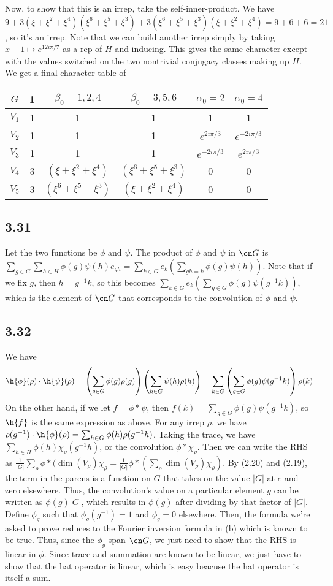 \documentclass{article}
\begin{document}
Now, to show that this is an irrep, take the self-inner-product. We have $9+3(\xi+\xi^2+\xi^4)(\xi^6+\xi^5+\xi^3)+3(\xi^6+\xi^5+\xi^3)(\xi+\xi^2+\xi^4)=9+6+6=21$, so it's an irrep. Note that we can build another irrep simply by taking $x+1\mapsto e^{12i\pi/7}$ as a rep of $H$ and inducing. This gives the same character except with the values switched on the two nontrivial conjugacy classes making up $H$. We get a final character table of

\begin{tabular}{c|ccccc}
$G$&1&$\beta_0=1,2,4$&$\beta_0=3,5,6$&$\alpha_0=2$&$\alpha_0=4$\\
\hline
$V_1$&1&1&1&1&1\\
$V_2$&1&1&1&$e^{2i\pi/3}$&$e^{-2i\pi/3}$\\
$V_3$&1&1&1&$e^{-2i\pi/3}$&$e^{2i\pi/3}$\\
$V_4$&3&$(\xi+\xi^2+\xi^4)$&$(\xi^6+\xi^5+\xi^3)$&0&0\\
$V_5$&3&$(\xi^6+\xi^5+\xi^3)$&$(\xi+\xi^2+\xi^4)$&0&0\\
\end{tabular}
\subsection*{3.31}
Let the two functions be $\phi$ and $\psi$. The product of $\phi$ and $\psi$ in $\cn G$ is $\sum_{g\in G}\sum_{h\in H}\phi(g)\psi(h)e_{gh}=\sum_{k\in G}e_k\left(\sum_{gh=k}\phi(g)\psi(h)\right)$. Note that if we fix $g$, then $h=g^{-1}k$, so this becomes $\sum_{k\in G}e_k\left(\sum_{g\in G}\phi(g)\psi(g^{-1}k)\right)$, which is the element of $\cn G$ that corresponds to the convolution of $\phi$ and $\psi$.
\subsection*{3.32}
We have 
\[
    \h{\phi}(\rho)\cdot\h{\psi}(\rho)=\left(\sum_{g\in G}\phi(g)\rho(g)\right)\left(\sum_{h\in G}\psi(h)\rho(h)\right)=\sum_{k\in G}\left(\sum_{g\in G}\phi(g)\psi(g^{-1}k)\right)\rho(k)
\]
On the other hand, if we let $f=\phi*\psi$, then $f(k)=\sum_{g\in G}\phi(g)\psi(g^{-1}k)$, so $\h{f}$ is the same expression as above.
For any irrep $\rho$, we have $\rho(g^{-1})\cdot\h{\phi}(\rho)=\sum_{h\in G}\phi(h)\rho(g^{-1}h)$. Taking the trace, we have $\sum_{h\in H}\phi(h)\chi_\rho(g^{-1}h)$, or the convolution $\phi*\chi_\rho$. Then we can write the RHS as $\frac{1}{|G|}\sum_\rho\phi*(\dim(V_\rho)\chi_\rho=\frac{1}{|G|}\phi*\left(\sum_\rho\dim(V_\rho)\chi_\rho\right)$. By (2.20) and (2.19), the term in the parens is a function on $G$ that takes on the value $|G|$ at $e$ and zero elsewhere. Thus, the convolution's value on a particular element $g$ can be written as $\phi(g)|G|$, which results in $\phi(g)$ after dividing by that factor of $|G|$.
Define $\phi_g$ such that $\phi_g(g^{-1})=1$ and $\phi_g=0$ elsewhere. Then, the formula we're asked to prove reduces to the Fourier inversion formula in (b) which is known to be true. Thus, since the $\phi_g$ span $\cn G$, we just need to show that the RHS is linear in $\phi$. Since trace and summation are known to be linear, we just have to show that the hat operator is linear, which is easy beacuse the hat operator is itself a sum.
\end{document}
